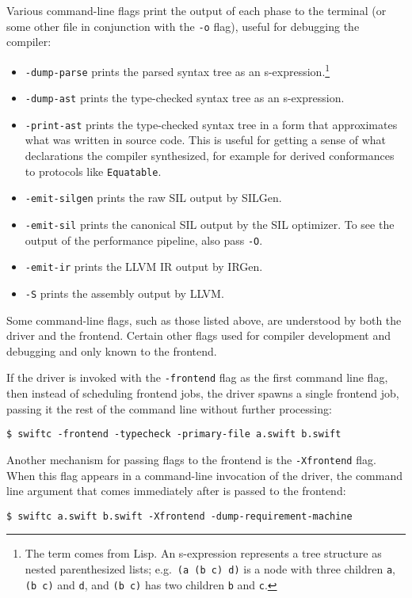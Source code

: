 \documentclass[a4paper,headsepline,bibliography=totoc,toc=flat,fleqn,twoside=semi]{scrbook}
\theoremstyle{definition}
\theoremstyle{definition}
\theoremstyle{definition}
\begin{document}
Various command-line flags print the output of each phase to the terminal (or some other file in conjunction with the \texttt{-o} flag), useful for debugging the compiler:
\begin{itemize}
\item \texttt{-dump-parse} prints the parsed syntax tree as an s-expression.\footnote{The term comes from Lisp. An s-expression represents a tree structure as nested parenthesized lists; e.g.\ \texttt{(a (b c) d)} is a node with three children \texttt{a}, \texttt{(b c)} and \texttt{d}, and \texttt{(b c)} has two children \texttt{b} and \texttt{c}.}
\item \texttt{-dump-ast} prints the type-checked syntax tree as an s-expression.
\item \texttt{-print-ast} prints the type-checked syntax tree in a form that approximates what was written in source code. This is useful for getting a sense of what declarations the compiler synthesized, for example for derived conformances to protocols like \texttt{Equatable}.
\item \texttt{-emit-silgen} prints the raw SIL output by SILGen.
\item \texttt{-emit-sil} prints the canonical SIL output by the SIL optimizer. To see the output of the performance pipeline, also pass \texttt{-O}.
\item \texttt{-emit-ir} prints the LLVM IR output by IRGen.
\item \texttt{-S} prints the assembly output by LLVM.
\end{itemize}
Some command-line flags, such as those listed above, are understood by both the driver and the frontend. Certain other flags used for compiler development and debugging and only known to the frontend.

If the driver is invoked with the \texttt{-frontend} flag as the first command line flag, then instead of scheduling frontend jobs, the driver spawns a single frontend job, passing it the rest of the command line without further processing:
\begin{Verbatim}
$ swiftc -frontend -typecheck -primary-file a.swift b.swift
\end{Verbatim}
Another mechanism for passing flags to the frontend is the \texttt{-Xfrontend} flag. When this flag appears in a command-line invocation of the driver, the command line argument that comes immediately after is passed to the frontend:
\begin{Verbatim}
$ swiftc a.swift b.swift -Xfrontend -dump-requirement-machine
\end{Verbatim}
\end{document}
